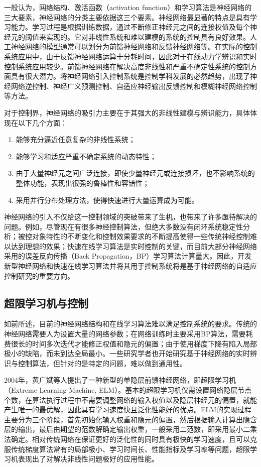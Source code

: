 一般认为，网络结构、激活函数（activation function）和学习算法是神经网络的三大要素，神经网络的分类主要依据这三个要素。神经网络最显著的特点是具有学习能力。学习过程是根据训练数据，通过不断修正神经元之间的连接权值及每个神经元的阈值来实现的。它对非线性系统和难以建模的系统的控制具有良好效果。人工神经网络的模型通常可以划分为前馈神经网络和反馈神经网络等。在实际的控制系统应用中，由于反馈神经网络运算十分耗时间，因此对于在线动力学辨识和实时控制系统应用较少。前馈神经网络在解决高度非线性和严重不确定性系统的控制方面具有很大潜力。将神经网络引入控制系统是控制学科发展的必然趋势，出现了神经网络逆控制、神经广义预测控制、自适应神经输出反馈控制和模糊神经网络控制等方法。

对于控制界，神经网络的吸引力主要在于其强大的非线性建模与辨识能力，具体体现在以下几个方面：
\begin{enumerate}
\item 能够充分逼近任意复杂的非线性系统；
\item 能够学习和适应严重不确定系统的动态特性；
\item 由于大量神经元之间广泛连接，即使少量神经元或连接损坏，也不影响系统的整体功能，表现出很强的鲁棒性和容错性；
\item 采用并行分布处理方法，使得快速进行大量运算成为可能。
\end{enumerate}

神经网络的引入不仅给这一控制领域的突破带来了生机，也带来了许多亟待解决的问题。例如，尽管现在有很多神经控制算法，但绝大多数没有闭环系统稳定性分析；被控对象特性的不断变化和控制效果要求的不断提高使得一些传统神经控制难以达到理想的效果；快速在线学习算法是实时控制的关键，而目前大部分神经网络采用的误差反向传播（Back Propagation，BP）学习算法计算量大。因此，开发新型神经网络和快速在线学习算法并将其用于控制系统将是基于神经网络的自适应控制研究的重要方向。

\subsection{超限学习机与控制}

如前所述，目前的神经网络结构和在线学习算法难以满足控制系统的要求。传统的神经网络需要人为设置大量的网络参数；在网络训练时主要采用BP算法，需要耗费很长的时间多次迭代才能修正权值和隐元的偏置；由于使用梯度下降有陷入局部极小的缺陷，而未到达全局最小。一些研究学者也开始研究基于神经网络的实时辨识与控制算法，但针对的是特定的问题，难以做到通用性。

2004年，黄广斌等人提出了一种新型的单隐层前馈神经网络，即超限学习机（Extreme Learning Machine, ELM）。基本的超限学习机仅需设置网络隐层节点个数，在算法执行过程中不需要调整网络的输入权值以及隐层神经元的偏置，就能产生唯一的最优解，因此具有学习速度快且泛化性能好的优点。ELM的实现过程主要分为三个阶段，首先初始化输入权重和隐元的偏置，然后根据输入计算出隐含层的输出，最后由期望的范数解确定输出权重，一般采用二范数，即采用最小二乘法确定。相对传统网络在保证更好的泛化性的同时具有极快的学习速度，且可以克服传统梯度算法常有的局部极小、学习时间长、性能指标及学习率等问题，超限学习机表现出了对解决非线性问题极好的应用性能。

